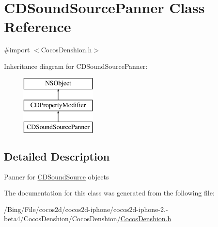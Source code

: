 \hypertarget{interface_c_d_sound_source_panner}{\section{C\-D\-Sound\-Source\-Panner Class Reference}
\label{interface_c_d_sound_source_panner}
}


{\ttfamily \#import $<$Cocos\-Denshion.\-h$>$}

Inheritance diagram for C\-D\-Sound\-Source\-Panner\-:\begin{figure}[H]
\begin{center}
\leavevmode
\includegraphics[height=3.000000cm]{interface_c_d_sound_source_panner}
\end{center}
\end{figure}


\subsection{Detailed Description}
Panner for \hyperlink{interface_c_d_sound_source}{C\-D\-Sound\-Source} objects 

The documentation for this class was generated from the following file\-:\begin{DoxyCompactItemize}
\item 
/\-Bing/\-File/cocos2d/cocos2d-\/iphone/cocos2d-\/iphone-\/2.-\/beta4/\-Cocos\-Denshion/\-Cocos\-Denshion/\hyperlink{_cocos_denshion_8h}{Cocos\-Denshion.\-h}\end{DoxyCompactItemize}
